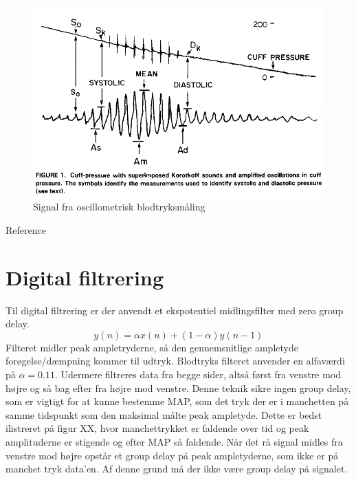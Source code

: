\begin{figure}[H]
	\includegraphics[width=\textwidth]{billeder/OptimalBlodtryksmaling.png}
	\caption{Signal fra oscillometrisk blodtryksmåling }\label{fig:goodMeasurement}
\end{figure}
Reference 

\section{Digital filtrering}
Til digital filtrering er der anvendt et ekspotentiel midlingsfilter med zero group delay.
\begin{equation}
	y(n) = \alpha x(n)+(1-\alpha )y(n-1)
\end{equation}
Filteret midler peak ampletryderne, så den gennemsnitlige ampletyde forøgelse/dæmpning kommer til udtryk. Blodtryks filteret anvender en alfaværdi på $\alpha = 0.11$. Udermere filtreres data fra begge sider, altså først fra venstre mod højre og så bag efter fra højre mod venstre. Denne teknik sikre ingen group delay, som er vigtigt for at kunne bestemme MAP, som det tryk der er i manchetten på samme tidspunkt som den maksimal målte peak ampletyde. Dette er bedst ilistreret på figur XX, hvor manchettrykket er faldende over tid og peak amplituderne er stigende og efter MAP så faldende. Når det rå signal midles fra venstre mod højre opstår et group delay på peak ampletyderne, som ikke er på manchet tryk data'en. Af denne grund må der ikke være group delay på signalet.

